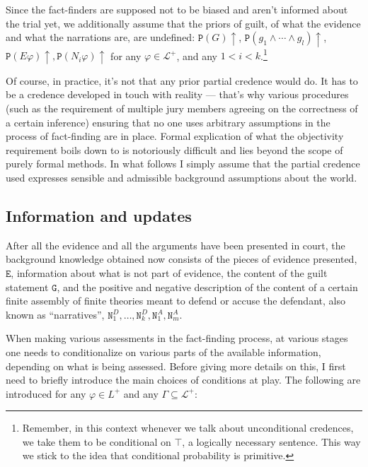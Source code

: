 \documentclass[10pt,leqno]{article}
\newcommand{\et}{\wedge}
\newcommand{\pr}[1]{\mbox{$\mathtt{P}(#1)$}}
\newcommand{\ndf}[1]{\mbox{$\pr{#1}\uparrow$}}
\begin{document}
 
 
 
 
   Since the fact-finders are supposed not to be biased and aren't informed about the trial yet, we additionally assume that the priors of guilt, of what the evidence and what the narrations are, are undefined: $\ndf{G}$, $\ndf{g_1\et \cdots \et g_l}$, $\ndf{E\varphi}, \ndf{N_i\varphi}$ for any $\varphi\in \mathcal{L}^+$, and any $1<i<k$.\footnote{Remember, in this context whenever we talk about unconditional credences, we take them to be conditional on $\top$, a logically necessary sentence. This way we stick to the idea that conditional probability is primitive.}

 Of course, in practice, it's not that any prior partial credence would do. It has to be a credence developed in touch with reality --- that's why various procedures (such as the requirement of  multiple jury members agreeing on the correctness of a certain inference)  ensuring that no one uses arbitrary assumptions in the process of fact-finding are in place. Formal explication of  what the objectivity requirement boils down to is  notoriously difficult and lies beyond the scope of purely formal methods. In what follows I simply assume that the partial credence used expresses sensible and admissible background assumptions about the world.





\subsection{Information and updates}



After all the evidence and all the arguments have been presented in court, the background knowledge obtained now consists of  the  pieces of evidence presented, $\mathtt{E}$,  information about what is not part of evidence,  
 the content of the guilt statement $\mathtt{G}$, and the positive and negative description of the content of a certain finite assembly of finite theories meant to defend or accuse the defendant, also known as ``narratives'', $\mathtt{N}^D_1,\dots, \mathtt{N}^D_k, \mathtt{N}^A_1, \mathtt{N} ^A_m$.
 
 
 When making various assessments in the fact-finding process, at various stages one needs to conditionalize on various parts of the available information, depending on what is being assessed. Before giving more details on this, I first need to briefly introduce the main choices of conditions at play. The following are introduced for any $\varphi\in L^+$ and any $\Gamma \subseteq \mathcal{L}^+$:
 
\end{document}

